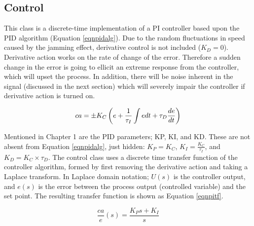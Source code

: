 \documentclass[twoside,a4]{report}
\def\br{\newline \newline \noindent}
\begin{document}
	\subsection*{Control} %
	This class is a discrete-time implementation of a PI controller based upon the PID algorithm (Equation \ref{eqnpidalg}). Due to the random fluctuations in speed caused by the jamming effect, derivative control is not included ($K_D = 0$). Derivative action works on the rate of change of the error. Therefore a sudden change in the error is going to ellicit an extreme response from  the controller, which will upset the process. In addition, there will be noise inherent in the signal (discussed in the next section) which will severely impair the controller if derivative action is turned on. 
	
	\begin{equation}
		ca = \pm K_C \left(e + \frac{1}{\tau _I} \int e \space dt + \tau _D \frac{de}{dt}\right)
		\label{eqnpidalg}
	\end{equation}
	
	
	\noindent
	Mentioned in Chapter 1 are the PID parameters; KP, KI, and KD. These are not absent from Equation \ref{eqnpidalg}, just hidden: \(K_P = K_C\), \(K_I = \frac{K_C}{\tau _I}\), and \(K_D = K_C \times \tau_D\).\br
	The control class uses a discrete time transfer function of the controller algorithm, formed by first removing the derivative action and taking a Laplace transform. In Laplace domain notation; $U(s)$ is the controller output, and $e(s)$ is the error between the process output (controlled variable) and the set point. The resulting transfer function is shown as Equation \ref{eqnpitf}.
	
	\begin{equation}
		\frac{ca}{e}(s) = \frac{K_P  s + K_I}{s}
		\label{eqnpitf}
	\end{equation}
	
	
\end{document}
